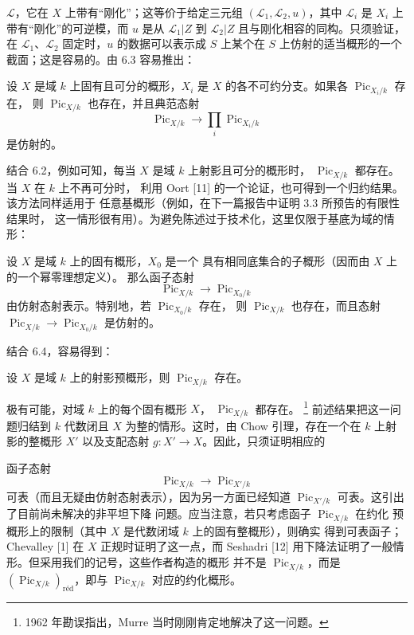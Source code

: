 $\mathcal L$，它在 $X$ 上带有“刚化”；这等价于给定三元组
$(\mathcal L_1,\mathcal L_2,u)$，其中 $\mathcal L_i$ 是
$X_i$ 上带有“刚化”的可逆模，而 $u$ 是从 $\mathcal L_1|Z$ 到
$\mathcal L_2|Z$ 且与刚化相容的同构。只须验证，在
$\mathcal L_1$、$\mathcal L_2$ 固定时，$u$ 的数据可以表示成 $S$
上某个在 $S$ 上仿射的适当概形的一个截面；这是容易的。由 6.3
容易推出：

 设 $X$ 是域 $k$ 上固有且可分的概形，$X_i$ 是
$X$ 的各不可约分支。如果各 $\operatorname{Pic}_{X_i/k}$ 存在，
则 $\operatorname{Pic}_{X/k}$ 也存在，并且典范态射
\[
\operatorname{Pic}_{X/k}\longrightarrow\prod_i\operatorname{Pic}_{X_i/k}
\]
是仿射的。

结合 6.2，例如可知，每当 $X$ 是域 $k$ 上射影且可分的概形时，
$\operatorname{Pic}_{X/k}$ 都存在。当 $X$ 在 $k$ 上不再可分时，
利用 Oort [11] 的一个论证，也可得到一个归约结果。该方法同样适用于
任意基概形（例如，在下一篇报告中证明 3.3 所预告的有限性结果时，
这一情形很有用）。为避免陈述过于技术化，这里仅限于基底为域的情形：

 设 $X$ 是域 $k$ 上的固有概形，$X_0$ 是一个
具有相同底集合的子概形（因而由 $X$ 上的一个幂零理想定义）。
那么函子态射
\[
\operatorname{Pic}_{X/k}\longrightarrow\operatorname{Pic}_{X_0/k}
\]
由仿射态射表示。特别地，若 $\operatorname{Pic}_{X_0/k}$ 存在，
则 $\operatorname{Pic}_{X/k}$ 也存在，而且态射
$\operatorname{Pic}_{X/k}\longrightarrow\operatorname{Pic}_{X_0/k}$
是仿射的。

结合 6.4，容易得到：

 设 $X$ 是域 $k$ 上的射影预概形，则
$\operatorname{Pic}_{X/k}$ 存在。

 极有可能，对域 $k$ 上的每个固有概形 $X$，
$\operatorname{Pic}_{X/k}$ 都存在。
\footnote{1962 年勘误指出，Murre 当时刚刚肯定地解决了这一问题。}
前述结果把这一问题归结到 $k$ 代数闭且 $X$ 为整的情形。这时，由
Chow 引理，存在一个在 $k$ 上射影的整概形 $X'$ 以及支配态射
$g:X'\longrightarrow X$。因此，只须证明相应的

函子态射
\[
\operatorname{Pic}_{X/k}\longrightarrow\operatorname{Pic}_{X'/k}
\]
可表（而且无疑由仿射态射表示），因为另一方面已经知道
$\operatorname{Pic}_{X'/k}$ 可表。这引出了目前尚未解决的非平坦下降
问题。应当注意，若只考虑函子 $\operatorname{Pic}_{X/k}$ 在约化
预概形上的限制（其中 $X$ 是代数闭域 $k$ 上的固有整概形），则确实
得到可表函子；Chevalley [1] 在 $X$ 正规时证明了这一点，而 Seshadri
[12] 用下降法证明了一般情形。但采用我们的记号，这些作者构造的概形
并不是 $\operatorname{Pic}_{X/k}$，而是
$(\operatorname{Pic}_{X/k})_{\mathrm{réd}}$，即与
$\operatorname{Pic}_{X/k}$ 对应的约化概形。

